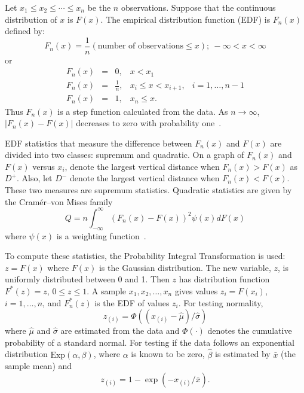 \documentclass[draft]{article}
\begin{document}
Let \(x_1 \le x_2 \le \cdots \le x_n\) be the \(n\)
observations. Suppose that the continuous distribution of \(x\)
is \(F\left(x\right)\). The empirical distribution function (EDF)
is \(F_n\left(x\right)\) defined by:
\begin{equation}
F_n\left(x\right) = \frac{1}{n}\left(\mbox{number of observations} 
\le x\right); \: -\infty < x < \infty
\end{equation}
or
\begin{displaymath}
\begin{array}{rclll}
F_n\left(x\right)& = &0, & x<x_1\\
F_n\left(x\right)& = &\frac{1}{n}, & x_i\le x<x_{i+1}, & i=1,\ldots,n-1\\
F_n\left(x\right)& = &1, & x_n\le x.
\end{array}
\end{displaymath}
Thus \(F_n\left(x\right)\) is a step function calculated from
the data. As \(n\rightarrow\infty\), \\
\(\left|F_n\left(x\right)- F\left(x\right)\right|\) 
decreases to zero with probability one~\cite{stephens86}.

EDF statistics that measure the difference between
\(F_n\left(x\right)\) and \(F\left(x\right)\) are divided
into two classes: supremum and quadratic.
On a graph of 
\(F_n\left(x\right)\) and \(F\left(x\right)\) versus \(x_i\),
denote the largest vertical distance when
\(F_n\left(x\right)>F\left(x\right)\) as \(D^+\).
Also, let \(D^-\) denote the largest vertical distance when
\(F_n\left(x\right)<F\left(x\right)\). These two
measures are supremum statistics.
Quadratic statistics are given by the Cram\'er--von Mises family
\begin{equation}
\label{eqn:cramer-family}
Q = n\int_{-\infty}^{\infty} 
\left(F_n\left(x\right) - F\left(x\right)\right)^2
\psi\left(x\right) d F\left(x\right)
\end{equation}
where \(\psi\left(x\right)\) is a weighting function~\cite{stephens86}.

To compute these statistics, the Probability Integral Transformation
is used: \(z=F\left(x\right)\) where \(F\left(x\right)\) is
the Gaussian distribution. The new variable, \(z\), is uniformly
distributed between 0 and 1. Then \(z\) has distribution 
function \(F^*\left(z\right)=z\), \(0\le z\le1\).
A sample \(x_1, x_2, \ldots, x_n\) gives values \(z_i=F\left(x_i\right)\),
\(i=1, \ldots, n\), and \(F^*_n\left(z\right)\) is the EDF of
values \(z_i\). For testing normality,
\begin{equation}
z_{\left(i\right)} = \Phi\left(
\left(x_{\left(i\right)}-\hat{\mu}\right)/\hat{\sigma}
\right)
\end{equation}
where \(\hat{\mu}\) and \(\hat{\sigma}\) are estimated from
the data and \(\Phi\left(\cdot\right)\) denotes the cumulative
probability of a standard normal. For testing if the data
follows an exponential distribution \(\mbox{Exp}\left(\alpha,\beta\right)\),
where \(\alpha\) is known to be zero, \(\hat{\beta}\)
is estimated by \(\bar{x}\) (the sample mean) and
\begin{equation}
z_{\left(i\right)} = 1-\exp\left(-x_{\left(i\right)}/\bar{x}\right).
\end{equation}
\end{document}
